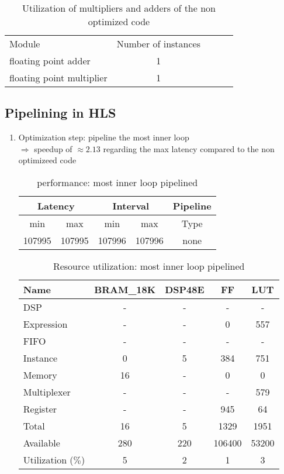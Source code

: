 \documentclass{article}
\begin{document}
\begin{table}[H]
	\centering
	\begin{tabular}{lcccc}
		Module & Number of instances \\
		floating point adder & 1 \\
		floating point multiplier & 1
	\end{tabular}
	\caption{Utilization of multipliers and adders of the non optimized code}
	\label{1-a-resources-arithmetic}
\end{table}


\subsection{Pipelining in HLS}
\label{1-b}
\begin{enumerate}
	\item Optimization step: pipeline the most inner loop \\
		$\Rightarrow$ speedup of $\approx 2.13$ regarding the max latency compared to the non optimizeed code
	\begin{table}[H]
		\centering
		\begin{tabular}{ccccc}
			\multicolumn{2}{c}{Latency} & \multicolumn{2}{c}{Interval} & Pipeline\\
			\hline
			min  &   max  &   min  &   max  &   Type  \\
			107995&  107995&  107996&  107996&   none  
		\end{tabular}
		\caption{performance: most inner loop pipelined}
		\label{1-b-perf-table-1}
	\end{table}

	\begin{table}[H]
	\centering
	\begin{tabular}{lcccc}
		Name      & BRAM\_18K& DSP48E&   FF   &  LUT  \\
		\hline
		DSP              &        -&      -&       -&      -\\
		Expression       &        -&      -&       0&    557\\
		FIFO             &        -&      -&       -&      -\\
		Instance         &        0&      5&     384&    751\\
		Memory           &       16&      -&       0&      0\\
		Multiplexer      &        -&      -&       -&    579\\
		Register         &        -&      -&     945&     64\\
		\hline
		Total            &       16&      5&    1329&   1951\\
		Available        &      280&    220&  106400&  53200\\
		\hline
		Utilization ($\%$)  &        5&      2&       1&      3
	\end{tabular}
	\caption{Resource utilization: most inner loop pipelined}
	\label{1-b-resources-1}
	\end{table}


\end{enumerate}
\end{document}
